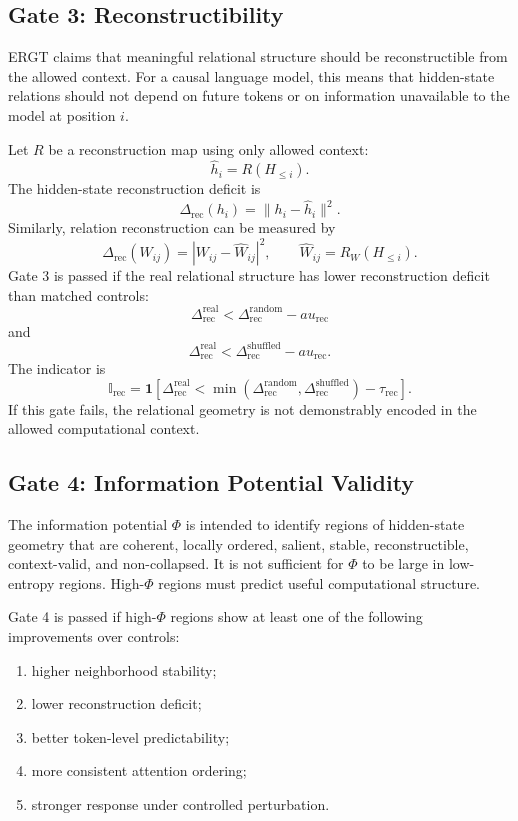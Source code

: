 \documentclass[11pt]{article}
\begin{document}
\subsection{Gate 3: Reconstructibility}

ERGT claims that meaningful relational structure should be reconstructible from the allowed context. For a causal language model, this means that hidden-state relations should not depend on future tokens or on information unavailable to the model at position $i$.

Let $R$ be a reconstruction map using only allowed context:
\[
\hat{h}_i=R(H_{\leq i}).
\]
The hidden-state reconstruction deficit is
\[
\Delta_{\mathrm{rec}}(h_i)
=
\|h_i-\hat{h}_i\|^2.
\]
Similarly, relation reconstruction can be measured by
\[
\Delta_{\mathrm{rec}}(W_{ij})
=
|W_{ij}-\hat{W}_{ij}|^2,
\qquad
\hat{W}_{ij}=R_W(H_{\leq i}).
\]
Gate 3 is passed if the real relational structure has lower reconstruction deficit than matched controls:
\[
\Delta_{\mathrm{rec}}^{\mathrm{real}}
<
\Delta_{\mathrm{rec}}^{\mathrm{random}}
-	au_{\mathrm{rec}}
\]
and
\[
\Delta_{\mathrm{rec}}^{\mathrm{real}}
<
\Delta_{\mathrm{rec}}^{\mathrm{shuffled}}
-	au_{\mathrm{rec}}.
\]
The indicator is
\[
\mathbb{I}_{\mathrm{rec}}
=
\mathbf{1}
\left[
\Delta_{\mathrm{rec}}^{\mathrm{real}}
<
\min(\Delta_{\mathrm{rec}}^{\mathrm{random}},\Delta_{\mathrm{rec}}^{\mathrm{shuffled}})-\tau_{\mathrm{rec}}
\right].
\]
If this gate fails, the relational geometry is not demonstrably encoded in the allowed computational context.

\subsection{Gate 4: Information Potential Validity}

The information potential $\Phi$ is intended to identify regions of hidden-state geometry that are coherent, locally ordered, salient, stable, reconstructible, context-valid, and non-collapsed. It is not sufficient for $\Phi$ to be large in low-entropy regions. High-$\Phi$ regions must predict useful computational structure.

Gate 4 is passed if high-$\Phi$ regions show at least one of the following improvements over controls:
\begin{enumerate}[leftmargin=2em]
    \item higher neighborhood stability;
    \item lower reconstruction deficit;
    \item better token-level predictability;
    \item more consistent attention ordering;
    \item stronger response under controlled perturbation.
\end{enumerate}
\end{document}
